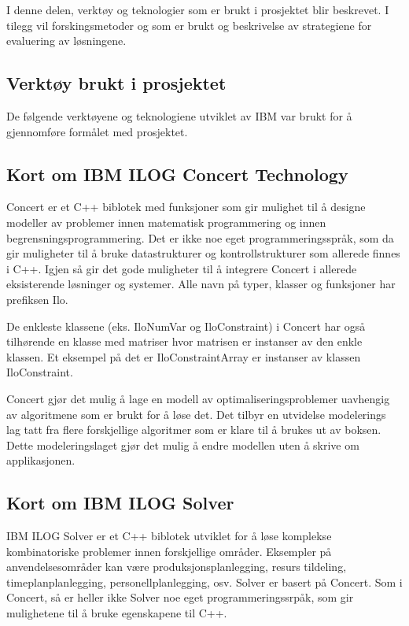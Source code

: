 I denne delen, verktøy og teknologier som er brukt i prosjektet blir beskrevet. I tilegg vil forskingsmetoder og som er brukt og beskrivelse av strategiene for evaluering av løsningene.

\subsection{Verktøy brukt i prosjektet}
De følgende verktøyene og teknologiene utviklet av IBM var brukt for å gjennomføre formålet med prosjektet.

\subsection{Kort om IBM ILOG Concert Technology}
Concert er et C++ biblotek med funksjoner som gir mulighet til å designe modeller av problemer innen matematisk programmering og innen begrensningsprogrammering. Det er ikke noe eget programmeringsspråk, som da gir muligheter til å bruke datastrukturer og kontrollstrukturer som allerede finnes i C++. Igjen så gir det gode muligheter til å integrere Concert i allerede eksisterende løsninger og systemer. Alle navn på typer, klasser og funksjoner har prefiksen Ilo.

De enkleste klassene (eks. IloNumVar og IloConstraint) i Concert har også tilhørende en klasse med matriser hvor matrisen er instanser av den enkle klassen. Et eksempel på det er IloConstraintArray er instanser av klassen IloConstraint.\cite{cpconcertilog}

Concert gjør det mulig å lage en modell av optimaliseringsproblemer uavhengig av algoritmene som er brukt for å løse det. Det tilbyr en utvidelse  modelerings lag tatt fra flere forskjellige algoritmer som er klare til å brukes ut av boksen. Dette modeleringslaget gjør det mulig å endre modellen uten å skrive om applikasjonen.\cite{cpsolverilog}

\subsection{Kort om IBM ILOG Solver}
IBM ILOG Solver er et C++ biblotek utviklet for å løse komplekse kombinatoriske problemer innen forskjellige områder. Eksempler på anvendelsesområder kan være produksjonsplanlegging, resurs tildeling, timeplanplanlegging, personellplanlegging, osv. Solver er basert på Concert. Som i Concert, så er heller ikke Solver noe eget programmeringssrpåk, som gir mulighetene til å bruke egenskapene til C++.

